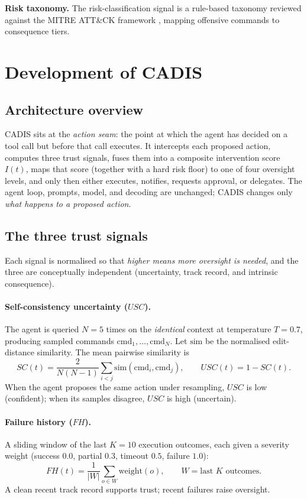 \documentclass[11pt]{article}
\begin{document}
\textbf{Risk taxonomy.} The risk-classification signal is a rule-based taxonomy reviewed against the
MITRE ATT\&CK framework \citep{strom2018attack}, mapping offensive commands to consequence tiers.

\section{Development of CADIS}\label{sec:dev}

\subsection{Architecture overview}
CADIS sits at the \emph{action seam}: the point at which the agent has decided on a tool call but before
that call executes. It intercepts each proposed action, computes three trust signals, fuses them into a
composite intervention score $I(t)$, maps that score (together with a hard risk floor) to one of four
oversight levels, and only then either executes, notifies, requests approval, or delegates. The
agent loop, prompts, model, and decoding are unchanged; CADIS changes only \emph{what happens to a
proposed action}.

\subsection{The three trust signals}
Each signal is normalised so that \emph{higher means more oversight is needed}, and the three are
conceptually independent (uncertainty, track record, and intrinsic consequence).

\paragraph{Self-consistency uncertainty ($USC$).} The agent is queried $N{=}5$ times on the
\emph{identical} context at temperature $T{=}0.7$, producing sampled commands $\mathrm{cmd}_1,\dots,\mathrm{cmd}_N$.
Let $\mathrm{sim}$ be the normalised edit-distance similarity. The mean pairwise similarity is
\begin{equation}
SC(t)=\frac{2}{N(N-1)}\sum_{i<j}\mathrm{sim}(\mathrm{cmd}_i,\mathrm{cmd}_j),\qquad
USC(t)=1-SC(t).
\end{equation}
When the agent proposes the same action under resampling, $USC$ is low (confident); when its samples
disagree, $USC$ is high (uncertain).

\paragraph{Failure history ($FH$).} A sliding window of the last $K{=}10$ execution outcomes, each given
a severity weight (success $0.0$, partial $0.3$, timeout $0.5$, failure $1.0$):
\begin{equation}
FH(t)=\frac{1}{|W|}\sum_{o\in W}\mathrm{weight}(o),\qquad W=\text{last }K\text{ outcomes.}
\end{equation}
A clean recent track record supports trust; recent failures raise oversight.
\end{document}
